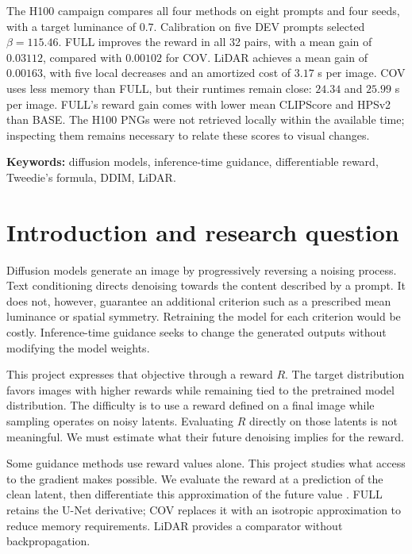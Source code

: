 \documentclass[11pt,a4paper]{article}
\begin{document}
The H100 campaign compares all four methods on eight prompts and four seeds, with a target luminance of $0.7$. Calibration on five DEV prompts selected $\beta=115.46$. FULL improves the reward in all 32 pairs, with a mean gain of $0.03112$, compared with $0.00102$ for COV. LiDAR achieves a mean gain of $0.00163$, with five local decreases and an amortized cost of $3.17$ s per image. COV uses less memory than FULL, but their runtimes remain close: $24.34$ and $25.99$ s per image. FULL's reward gain comes with lower mean CLIPScore and HPSv2 than BASE. The H100 PNGs were not retrieved locally within the available time; inspecting them remains necessary to relate these scores to visual changes.

\vspace{0.5em}
\noindent\textbf{Keywords:} diffusion models, inference-time guidance, differentiable reward, Tweedie's formula, DDIM, LiDAR.
\clearpage
{\small\setlength{\parskip}{2pt}\tableofcontents}
\clearpage
{}

\section{Introduction and research question}
Diffusion models generate an image by progressively reversing a noising process. Text conditioning directs denoising towards the content described by a prompt. It does not, however, guarantee an additional criterion such as a prescribed mean luminance or spatial symmetry. Retraining the model for each criterion would be costly. Inference-time guidance seeks to change the generated outputs without modifying the model weights.

This project expresses that objective through a reward $R$. The target distribution favors images with higher rewards while remaining tied to the pretrained model distribution. The difficulty is to use a reward defined on a final image while sampling operates on noisy latents. Evaluating $R$ directly on those latents is not meaningful. We must estimate what their future denoising implies for the reward.

Some guidance methods use reward values alone. This project studies what access to the gradient makes possible. We evaluate the reward at a prediction of the clean latent, then differentiate this approximation of the future value \cite{uehara,dps,universal,lidar}. FULL retains the U-Net derivative; COV replaces it with an isotropic approximation to reduce memory requirements. LiDAR provides a comparator without backpropagation.
\end{document}
